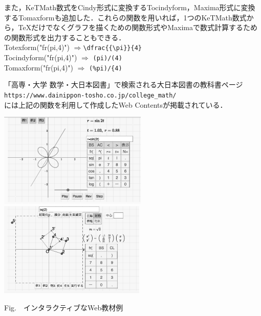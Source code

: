 \documentclass[a4j,12pt]{ujarticle}
\begin{document}
また，KeTMath数式をCindy形式に変換するTocindyform，Maxima形式に変換するTomaxformも追加した．これらの関数を用いれば，1つのKeTMath数式から，\TeX だけでなくグラフを描くための関数形式やMaximaで数式計算するための関数形式を出力することもできる．\\
\hspace*{4zw}Totexform("fr(pi,4)") $\Longrightarrow$\verb|\dfrac{{\pi}}{4}|\\
\hspace*{4zw}Tocindyform("fr(pi,4)")  $\Longrightarrow$ \verb|(pi)/(4)|\\
\hspace*{4zw}Tomaxform("fr(pi,4)")  $\Longrightarrow$ \verb|(%pi)/{4)|

\vspace{1mm}

\noindent
「高専・大学 数学・大日本図書」で検索される大日本図書の教科書ページ\\%
\hspace*{2zw}\verb|https://www.dainippon-tosho.co.jp/college_math/|\\
には上記の関数を利用して作成したWeb Contentsが掲載されている．


\begin{center}
\includegraphics[bb=0.00 0.00 906.00 577.00,height=45mm]{fig/dntcalbw.pdf}
%
\hspace{5mm}%
\includegraphics[bb=0.00 0.00 898.00 578.00,height=45mm]{fig/dntlinbw.pdf}

\addtocounter{figure}{1}Fig.\thefigure\ \ インタラクティブなWeb教材例\vspace{-1mm}

\end{center}
\end{document}
